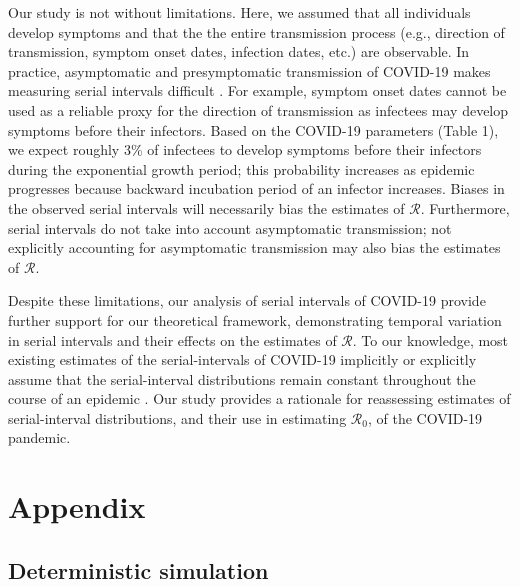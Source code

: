 \documentclass[12pt]{article}
\newcommand{\Rx}[1]{\ensuremath{{\mathcal R}_{#1}}\xspace}
\newcommand{\Ro}{\Rx{0}}
\newcommand{\RR}{\ensuremath{{\mathcal R}}\xspace}
\begin{document}
Our study is not without limitations.
Here, we assumed that all individuals develop symptoms and that the the entire transmission process (e.g., direction of transmission, symptom onset dates, infection dates, etc.) are observable.
In practice, asymptomatic and presymptomatic transmission of COVID-19 makes measuring serial intervals difficult \citep{bai2020presumed,he2020temporal,wei2020presymptomatic}.
For example, symptom onset dates cannot be used as a reliable proxy for the direction of transmission as infectees may develop symptoms before their infectors.
Based on the COVID-19 parameters (Table 1), we expect roughly 3\% of infectees to develop symptoms before their infectors during the exponential growth period; 
this probability increases as epidemic progresses because backward incubation period of an infector increases.
Biases in the observed serial intervals will necessarily bias the estimates of \RR. 
Furthermore, serial intervals do not take into account asymptomatic transmission; 
not explicitly accounting for asymptomatic transmission may also bias the estimates of \RR \citep{park2020time}.

Despite these limitations, our analysis of serial intervals of COVID-19 provide further support for our theoretical framework, demonstrating temporal variation in serial intervals and their effects on the estimates of \RR.
To our knowledge, most existing estimates of the serial-intervals of COVID-19 implicitly or explicitly assume that the serial-interval distributions remain constant throughout the course of an epidemic \citep{du2020serial, he2020temporal, nishiura2020serial,tindale2020transmission,zhao2020estimating,zhang2020evolving}.
Our study provides a rationale for reassessing estimates of serial-interval distributions, and their use in estimating \Ro, of the COVID-19 pandemic.

\pagebreak

\section{Appendix}

\subsection{Deterministic simulation}
\end{document}
